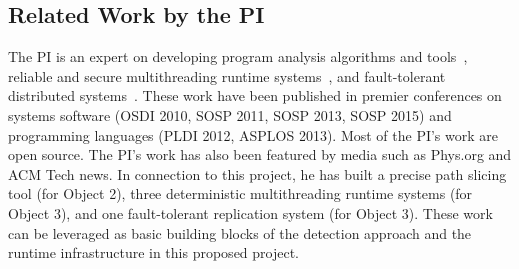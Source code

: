 % 


\subsection{Related Work by the PI} \label{sec:my-work}
% 

The PI is an expert on developing program analysis algorithms and 
tools~\cite{wu:pldi12, woodpecker:asplos13, repframe:apsys15}, reliable and 
secure multithreading runtime systems~\cite{smt:cacm, cui:tern:osdi10, 
peregrine:sosp11, parrot:sosp13}, and fault-tolerant distributed 
systems~\cite{crane:sosp15}. These work have been published in premier 
conferences on systems software (OSDI 2010, SOSP 2011, SOSP 2013, SOSP 2015) and 
programming languages (PLDI 2012, ASPLOS 2013). Most of the PI's work are open 
source. The PI's work has also been featured by media such as Phys.org and 
ACM Tech news. In connection to this project, he has built a precise path 
slicing tool (for Object 2), three deterministic multithreading runtime systems 
(for Object 3), and one fault-tolerant replication system (for Object 3). These 
work can be leveraged as basic building blocks of the detection approach and 
the runtime infrastructure in this proposed project.


